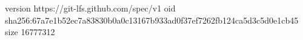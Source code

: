 version https://git-lfs.github.com/spec/v1
oid sha256:67a7e1b52ec7a83830b0a0c13167b933ad0f37ef7262fb124ca5d3c5d0e1cb45
size 16777312
